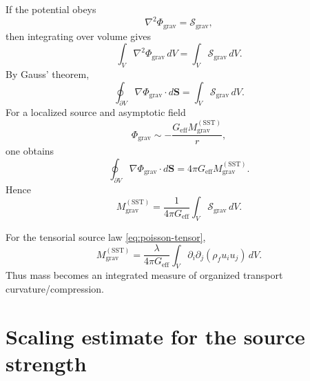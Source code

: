\documentclass[11pt]{article}
\newcommand{\rhoF}{\rho_{\!f}}
\newcommand{\eff}{\mathrm{eff}}
\newcommand{\SST}{\mathrm{SST}}
\newcommand{\grav}{\mathrm{grav}}
\begin{document}
        If the potential obeys
        \[
            \nabla^2 \Phi_{\grav} = \mathcal{S}_{\grav},
        \]
        then integrating over volume gives
        \begin{equation}
            \int_V \nabla^2\Phi_{\grav}\,dV
            =
            \int_V \mathcal{S}_{\grav}\,dV.
            \label{eq:int-poisson}
        \end{equation}
        By Gauss' theorem,
        \begin{equation}
            \oint_{\partial V} \nabla\Phi_{\grav}\cdot d\mathbf{S}
            =
            \int_V \mathcal{S}_{\grav}\,dV.
            \label{eq:gauss-phi}
        \end{equation}
        For a localized source and asymptotic field
        \[
            \Phi_{\grav}\sim -\frac{G_{\eff} M_{\grav}^{(\SST)}}{r},
        \]
        one obtains
        \begin{equation}
            \oint_{\partial V} \nabla\Phi_{\grav}\cdot d\mathbf{S}
            =
            4\pi G_{\eff} M_{\grav}^{(\SST)}.
            \label{eq:gauss-mass}
        \end{equation}
        Hence
        \begin{equation}
            \boxed{
                M_{\grav}^{(\SST)}
                =
                \frac{1}{4\pi G_{\eff}}
                \int_V \mathcal{S}_{\grav}\,dV.
            }
            \label{eq:Mg-general}
        \end{equation}
        
        For the tensorial source law \eqref{eq:poisson-tensor},
        \begin{equation}
            \boxed{
                M_{\grav}^{(\SST)}
                =
                \frac{\lambda}{4\pi G_{\eff}}
                \int_V \partial_i\partial_j(\rhoF u_i u_j)\,dV.
            }
            \label{eq:Mg-tensor}
        \end{equation}
        Thus mass becomes an integrated measure of organized transport curvature/compression.
        
        \section{Scaling estimate for the source strength}
        
\end{document}
